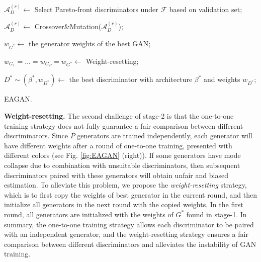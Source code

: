 \documentclass[runningheads]{llncs}
\begin{document}
\begin{algorithm}[!ht]
{        
        $\mathcal{A}^{(r)}_D\leftarrow$ Select Pareto-front discriminators under $\mathcal{F}$ based on validation set;
        
        $\mathcal{A}_D^{(r)}\leftarrow$ Crossover\&Mutation($\mathcal{A}_D^{(r)}$);
        
        $w_{G^*}\leftarrow$ the generator weights of the best GAN;
        
        $w_{G_1}=...=w_{G_P}=w_{G^*}\leftarrow$ Weight-resetting;
    }
    $D^*\sim(\beta^*,w_{D^*})\leftarrow$ the best discriminator with architecture $\beta^*$ and weights $w_{D^*}$;
    \caption{EAGAN.}
    \label{alg:eagan}
\end{algorithm}



\textbf{Weight-resetting.} The second challenge of stage-2 is that the one-to-one training strategy does not fully guarantee a fair comparison between different discriminators. Since $P$ generators are trained independently, each generator will have different weights after a round of one-to-one training, presented with different colors (see Fig. \ref{fig:EAGAN} (right)). If some generators have mode collapse due to combination with unsuitable discriminators, then subsequent discriminators paired with these generators will obtain unfair and biased estimation. To alleviate this problem, we propose the \textit{weight-resetting} strategy, which is to first copy the weights of best generator in the current round, and then initialize all generators in the next round with the copied weights. In the first round, all generators are initialized with the weights of $G^*$ found in stage-1. In summary, the one-to-one training strategy allows each discriminator to be paired with an independent generator, and the weight-resetting strategy ensures a fair comparison between different discriminators and alleviates the instability of GAN training.
\end{document}
